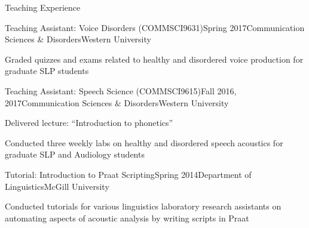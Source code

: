 \documentclass{resume} %
\begin{document}
\begin{rSection}{Teaching Experience}
	\begin{rSubsection}{Teaching Assistant: Voice Disorders (COMMSCI9631)}{Spring 2017}{Communication Sciences \& Disorders}{Western University}
	\item Graded quizzes and exams related to healthy and disordered voice production for graduate SLP students
	\end{rSubsection}
	
	\begin{rSubsection}{Teaching Assistant: Speech Science (COMMSCI9615)}{Fall 2016, 2017}{Communication Sciences \& Disorders}{Western University}
	\item Delivered lecture: ``Introduction to phonetics''
	\item Conducted three weekly labs on healthy and disordered speech acoustics for graduate SLP and Audiology students
	\end{rSubsection}
	
	\begin{rSubsection}{Tutorial: Introduction to Praat Scripting}{Spring 2014}{Department of Linguistics}{McGill University}
	\item Conducted tutorials for various linguistics laboratory research assistants on automating aspects of acoustic analysis by writing scripts in Praat
	\end{rSubsection}

\end{rSection}

\end{document}
